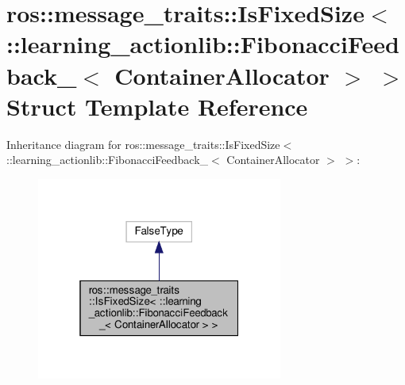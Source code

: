 \hypertarget{structros_1_1message__traits_1_1IsFixedSize_3_01_1_1learning__actionlib_1_1FibonacciFeedback___3_01ContainerAllocator_01_4_01_4}{}\section{ros\+:\+:message\+\_\+traits\+:\+:Is\+Fixed\+Size$<$ \+:\+:learning\+\_\+actionlib\+:\+:Fibonacci\+Feedback\+\_\+$<$ Container\+Allocator $>$ $>$ Struct Template Reference}
\label{structros_1_1message__traits_1_1IsFixedSize_3_01_1_1learning__actionlib_1_1FibonacciFeedback___3_01ContainerAllocator_01_4_01_4}


Inheritance diagram for ros\+:\+:message\+\_\+traits\+:\+:Is\+Fixed\+Size$<$ \+:\+:learning\+\_\+actionlib\+:\+:Fibonacci\+Feedback\+\_\+$<$ Container\+Allocator $>$ $>$\+:
\nopagebreak
\begin{figure}[H]
\begin{center}
\leavevmode
\includegraphics[width=229pt]{structros_1_1message__traits_1_1IsFixedSize_3_01_1_1learning__actionlib_1_1FibonacciFeedback___3946d8fe02792bf323838dea88430be24}
\end{center}
\end{figure}


